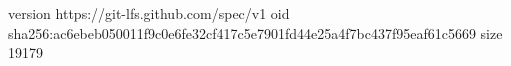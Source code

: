 version https://git-lfs.github.com/spec/v1
oid sha256:ac6ebeb050011f9c0e6fe32cf417c5e7901fd44e25a4f7bc437f95eaf61c5669
size 19179
